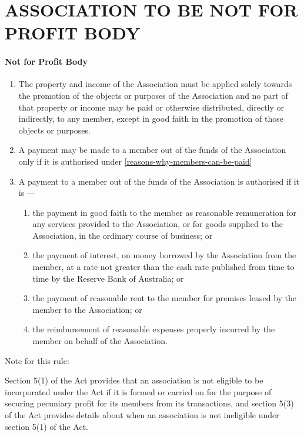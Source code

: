 \documentclass[../constitution.tex]{subfiles}
\begin{document}
\part{ASSOCIATION TO BE NOT FOR PROFIT BODY} \label{part-2-association-to-be-not-for-profit-body}


\subsection{Not for Profit Body} \label{not-for-profit-body} 

\begin{enumerate}

\item The property and income of the Association must be applied solely towards the promotion of the objects or purposes of the Association and no part of that property or income may be paid or otherwise distributed, directly or indirectly, to any member, except in good faith in the promotion of those objects or purposes.
\item A payment may be made to a member out of the funds of the Association only if it is authorised under  \ref{reasons-why-members-can-be-paid}
\item A payment to a member out of the funds of the Association is authorised if it is ---

  \begin{enumerate} \label{reasons-why-members-can-be-paid}
  \item the payment in good faith to the member as reasonable remuneration for any services provided to the Association, or for goods supplied to the Association, in the ordinary course of business; or
  \item the payment of interest, on money borrowed by the Association from the member, at a rate not greater than the cash rate published from time to time by the Reserve Bank of Australia; or
  \item the payment of reasonable rent to the member for premises leased by the member to the Association; or
  \item the reimbursement of reasonable expenses properly incurred by the member on behalf of the Association.
  \end{enumerate}
\end{enumerate}


Note for this rule: 

Section 5(1) of the Act provides that an association is not eligible to be 
incorporated under the Act if it is formed or carried on for the purpose 
of securing pecuniary profit for its members from its transactions, and 
section 5(3) of the Act provides details about when an association is 
not ineligible under section 5(1) of the Act. 
\end{document}
